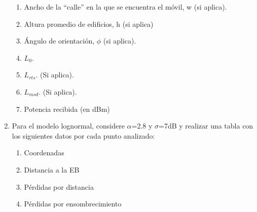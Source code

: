 \begin{enumerate}
\begin{enumerate}
		      \item Ancho de la “calle” en la que se encuentra el móvil, w (si aplica).
		      \item Altura promedio de edificios, h (si aplica)
		      \item Ángulo de orientación, $\phi$ (si aplica).
		      \item $L_0.$
		      \item $L_{rts}$. (Si aplica).
		      \item $L_{msd}$. (Si aplica).
		      \item Potencia recibida (en dBm)
	      \end{enumerate}
	      \begin{table}[H]
		      \centering
		      \caption{Parámetros de propagación para diferentes ubicaciones}
		      \label{tab:parametros_propagacion}
	      \end{table}
	\item Para el modelo lognormal, considere $\alpha$=2.8 y $\sigma$=7dB y realizar una tabla con los siguientes datos por cada punto analizado:
	      \begin{enumerate}
		      \item Coordenadas
		      \item Distancia a la EB
		      \item Pérdidas por distancia
		      \item Pérdidas por ensombrecimiento

\end{enumerate}
\end{enumerate}
